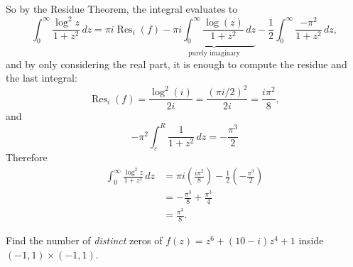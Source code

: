 \documentclass{article}
\newenvironment{problem}[2][Problem]{\begin{trivlist}
\item[\hskip \labelsep {\bfseries #1}\hskip \labelsep {\bfseries #2.}]}{\end{trivlist}}
\begin{document}
So by the Residue Theorem, the integral evaluates to \[
  \int_0^\infty\frac{\log^2 z}{1 + z^2}\,dz
  = \pi i \operatorname{Res}_i(f)
    - \underbrace{\pi i\int_0^\infty\frac{\log(z)}{1 + z^2}\,dz}_\text{purely imaginary}
    - \frac{1}{2}\int_0^\infty\frac{-\pi^2}{1 + z^2}\,dz,
\] and by only considering the real part, it is enough to compute the residue and the last integral: \[
  \operatorname{Res}_i(f)
  = \frac{\log^2(i)}{2i}
  = \frac{(\pi i/2)^2}{2i}
  = \frac{i\pi^2}{8},
\] and \[
  -\pi^2\int_\varepsilon^R\frac{1}{1 + z^2}\,dz = -\frac{\pi^3}{2}
\]
Therefore \begin{align*}
  \int_0^\infty\frac{\log^2 z}{1 + z^2}\,dz
  &= \pi i \left(\frac{i\pi^2}{8}\right)
    - \frac{1}{2}\left(-\frac{\pi^3}{2}\right) \\
  &= -\frac{\pi^3}{8} + \frac{\pi^3}{4} \\
  &= \frac{\pi^3}{8}.
\end{align*}
\pagebreak

\begin{problem}{2}
  Find the number of \textit{distinct} zeros of $f(z) = z^6 + (10 - i)z^4 + 1$
  inside $(-1, 1)\times(-1,1)$.
\end{problem}
\end{document}
